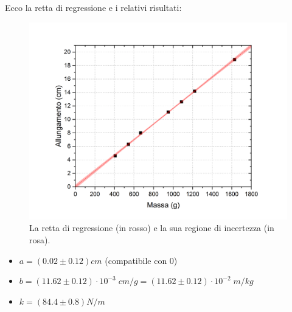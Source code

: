 \documentclass{article}
\begin{document}
Ecco la retta di regressione e i relativi risultati:
\begin{figure}[H]
    \includegraphics[trim={0 1.8cm 0 0},width=\textwidth]{SaticoReg.jpg}
    \caption{
        La retta di regressione (in rosso)
        e la sua regione di incertezza (in rosa).
    }
\end{figure}
\begin{itemize}
    \item $a = \left(0.02\pm0.12\right)\unit{cm}$ (compatibile con 0)
    \item $
        b = \left(11.62\pm0.12\right)\cdot10^{-3}\;\unit{cm\per g}
          = \left(11.62\pm0.12\right)\cdot10^{-2}\;\unit{m\per kg}
    $
    \item $k = \left(84.4\pm0.8\right)\unit{N\per m}$
\end{itemize}
\end{document}
